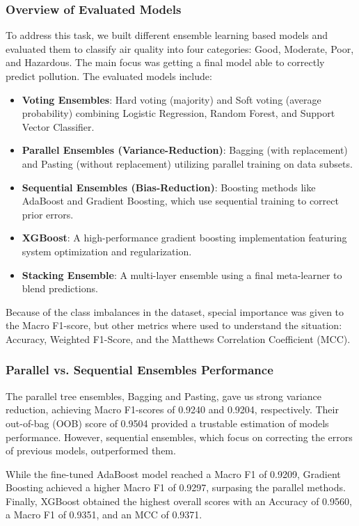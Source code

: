 \documentclass[a4paper,12pt]{article}
\begin{document}
	\subsubsection{Overview of Evaluated Models}
	To address this task, we built different ensemble learning based models and evaluated them to classify air quality into four categories: Good, Moderate, Poor, and Hazardous. The main focus was getting a final model able to correctly predict pollution. The evaluated models include:
	\begin{itemize}
		\item \textbf{Voting Ensembles}: Hard voting (majority) and Soft voting (average probability) combining Logistic Regression, Random Forest, and Support Vector Classifier.
		\item \textbf{Parallel Ensembles (Variance-Reduction)}: Bagging (with replacement) and Pasting (without replacement) utilizing parallel training on data subsets.
		\item \textbf{Sequential Ensembles (Bias-Reduction)}: Boosting methods like AdaBoost and Gradient Boosting, which use sequential training to correct prior errors.
		\item \textbf{XGBoost}: A high-performance gradient boosting implementation featuring system optimization and regularization.
		\item \textbf{Stacking Ensemble}: A multi-layer ensemble using a final meta-learner to blend predictions.
	\end{itemize}
	Because of the class imbalances in the dataset, special importance was given to the Macro F1-score, but other metrics where used to understand the situation: Accuracy, Weighted F1-Score, and the Matthews Correlation Coefficient (MCC).
	
	\subsubsection{Parallel vs. Sequential Ensembles Performance}
	The parallel tree ensembles, Bagging and Pasting, gave us strong variance reduction, achieving Macro F1-scores of 0.9240 and 0.9204, respectively. Their out-of-bag (OOB) score of 0.9504 provided a trustable estimation of models performance. However, sequential ensembles, which focus on correcting the errors of previous models, outperformed them. 
	
	While the fine-tuned AdaBoost model reached a Macro F1 of 0.9209, Gradient Boosting achieved a higher Macro F1 of 0.9297, surpasing the parallel methods. Finally, XGBoost obtained the highest overall scores with an Accuracy of 0.9560, a Macro F1 of 0.9351, and an MCC of 0.9371. 
	
\end{document}
